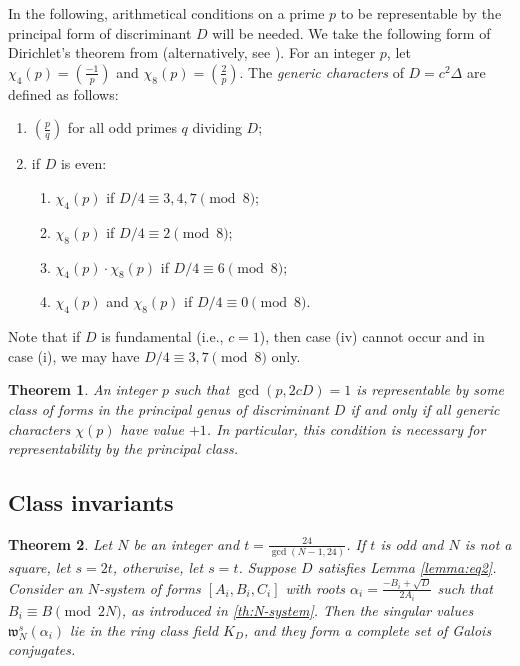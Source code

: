 \documentclass[12pt,twoside,leqno]{article}
\newtheorem{theorem}{Theorem}[section]
\numberwithin{equation}{section}
\newcommand{\legendre}[2]{\genfrac {(}{)}{1pt}{}{#1}{#2}}
\newcommand{\w}{\mathfrak w}
\newenvironment {alphenumerate}
   {\renewcommand {\labelenumi}{(\alph {enumi})}
    \renewcommand {\labelenumii}{(\alph {enumi}\arabic {enumii})}
    \begin {enumerate}}
   {\end {enumerate}}
\newenvironment {romanenumerate}
{\renewcommand {\labelenumii}{(\roman {enumii})}
    \begin {enumerate}}
{\end {enumerate}}
\begin{document}
In the following, arithmetical conditions on a prime $p$ to be
representable by the principal form of discriminant $D$ will be
needed.
We take the following form of Dirichlet's theorem from
\cite[Ch. 4]{Buell89} (alternatively, see \cite[Chap 18,
G]{Cohn78}). For an integer $p$, let $\chi_4(p) = \legendre{-1}{p}$ and
$\chi_8(p) = \legendre{2}{p}$. The {\em generic characters} of $D =
c^2 \Delta$ are defined as follows:
\begin{alphenumerate}
 \item $\legendre{p}{q}$ for all odd primes $q$ dividing $D$;
 \item if $D$ is even:
  \begin{romanenumerate}
   \item $\chi_4(p)$ if $D/4 \equiv 3, 4, 7\pmod 8$;
   \item $\chi_8(p)$ if  $D/4 \equiv 2\pmod 8$;
   \item $\chi_4(p) \cdot \chi_8(p)$ if  $D/4 \equiv 6\pmod 8$;
   \item $\chi_4(p)$ and $\chi_8(p)$ if  $D/4 \equiv 0\pmod 8$.
  \end{romanenumerate}
\end{alphenumerate}
Note that if $D$ is fundamental (i.e., $c=1$), then case (iv) cannot
occur and in case (i), we may have $D/4 \equiv 3, 7\pmod 8$ only.

\begin{theorem}\label{thm-Dirichlet}
An integer $p$ such that $\gcd(p, 2cD)=1$ is representable by some
class of forms in the principal genus of discriminant $D$ if and only
if all generic characters $\chi(p)$ have value $+1$.
In particular, this condition is necessary for representability
by the principal class.
\end{theorem}

\subsection{Class invariants}

\begin {theorem}
\label {th:full}
Let $N$ be an integer and $t = \frac {24}{\gcd (N - 1, 24)}$. If $t$ is
odd and $N$ is not a square, let $s = 2t$, otherwise, let $s = t$.
Suppose $D$ satisfies Lemma \ref{lemma:eq2}.
Consider an $N$-system of forms $[A_i, B_i, C_i]$ with roots
$\alpha_i = \frac {- B_i + \sqrt D}{2 A_i}$
such that $B_i \equiv B \pmod {2 N}$, as introduced in
\ref{th:N-system}. Then the singular values $\w_N^s (\alpha_i)$ lie
in the ring class field $K_D$, and they form a complete set of Galois
conjugates.
\end {theorem}
\end{document}
